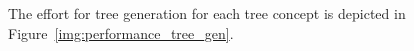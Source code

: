 
The effort for tree generation for each tree concept is depicted in Figure~\ref{img:performance_tree_gen}.

